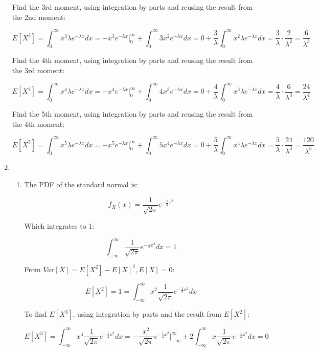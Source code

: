 \documentclass[11pt,letterpaper,titlepage]{article}
\begin{document}
\begin{enumerate}
    Find the 3rd moment, using integration by parts and reusing the result from the 2nd moment:
    
    $$ E[X^3] = \int_{0}^{\infty} x^3 \lambda e^{-\lambda x} dx = -x^3 e^{-\lambda x}\Big|_{0}^{\infty} + \int_{0}^{\infty} 3x^2 e^{-\lambda x} dx =  0 + \frac{3}{\lambda} \int_{0}^{\infty} x^2 \lambda e^{-\lambda x} dx = \frac{3}{\lambda} \cdot \frac{2}{\lambda^2} = \frac{6}{\lambda^3} $$
    
    Find the 4th moment, using integration by parts and reusing the result from the 3rd moment:
    
    $$ E[X^4] = \int_{0}^{\infty} x^4 \lambda e^{-\lambda x} dx  = -x^4 e^{-\lambda x}\Big|_{0}^{\infty} + \int_{0}^{\infty} 4 x^3 e^{-\lambda x} dx  =   0 + \frac{4}{\lambda} \int_{0}^{\infty} x^3 \lambda e^{-\lambda x} dx = \frac{4}{\lambda} \cdot \frac{6}{\lambda^3} = \frac{24}{\lambda^4} $$
    
    Find the 5th moment, using integration by parts and reusing the result from the 4th moment:
    
    $$ E[X^5] = \int_{0}^{\infty} x^5 \lambda e^{-\lambda x} dx  = -x^5 e^{-\lambda x}\Big|_{0}^{\infty} + \int_{0}^{\infty} 5 x^4 e^{-\lambda x} dx  =   0 + \frac{5}{\lambda} \int_{0}^{\infty} x^4 \lambda e^{-\lambda x} dx = \frac{5}{\lambda} \cdot \frac{24}{\lambda^3} = \frac{120}{\lambda^5} $$
    
    \item \begin{enumerate}
        \item The PDF of the standard normal is:
        
        $$ f_{X} (x) = \frac{1}{\sqrt{2\pi}} e^{-\frac{1}{2} x^2} $$
        
        Which integrates to 1:
        
        $$ \int_{-\infty}^{\infty} \frac{1}{\sqrt{2\pi}} e^{-\frac{1}{2} x^2} dx = 1 $$
        
        From $ Var[X] = E[X^2] - E[X]^2, E[X] = 0 $:
        
        $$ E[X^2] = 1 = \int_{-\infty}^{\infty} x^2 \frac{1}{\sqrt{2\pi}} e^{-\frac{1}{2} x^2} dx $$
        
        To find $ E[X^3] $, using integration by parts and the result from $ E[X^2] $:
        
        $$ E[X^3] = \int_{-\infty}^{\infty} x^3 \frac{1}{\sqrt{2\pi}} e^{-\frac{1}{2} x^2} dx = -\frac{x^2}{\sqrt{2\pi}} e^{-\frac{1}{2} x^2} \Big|_{-\infty}^{\infty} + 2 \int_{-\infty}^{\infty} x \frac{1}{\sqrt{2\pi}} e^{-\frac{1}{2} x^2} dx = 0 $$
        

\end{enumerate}
\end{enumerate}
\end{document}

